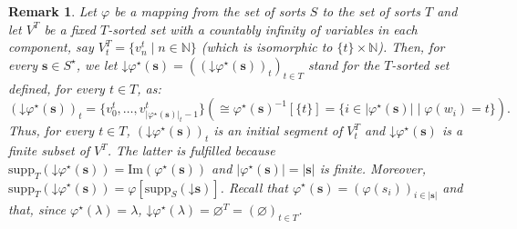 \documentclass{amsart}
\newcommand{\bb}[1]{\ensuremath
	{\lvert #1 \rvert}}
\newcommand{\vs}[1]{\mathbin{\downarrow}#1}
\theoremstyle{plain}
\newtheorem{remark}[theorem]{Remark}
\theoremstyle{definition}
\begin{document}
\begin{remark}\label{Rdop}
	Let $\varphi$ be a mapping from the set of sorts $S$ to the set of sorts $T$ and let $V^{T}$ be a fixed $T$-sorted set with a countably infinity of variables in each component, say $V^{T}_{t} = \{v^{t}_{n}\mid n\in \mathbb{N}\}$ (which is isomorphic to $\{t\}\times\mathbb{N}$). Then, for every $\mathbf{s}\in S^{\star}$, we let $\vs{\varphi^{\star}(\mathbf{s})} = ((\vs{\varphi^{\star}(\mathbf{s})})_{t})_{t\in T}$ stand for the $T$-sorted set  defined, for every $t\in T$, as:
	$$
	(\vs{\varphi^{\star}(\mathbf{s})})_{t} = \{v^{t}_{0},\ldots,v^{t}_{\bb{\varphi^{\star}(\mathbf{s})}_{t}-1}\} (\cong \varphi^{\star}(\mathbf{s})^{-1}[\{t\}] = \{i\in \bb{\varphi^{\star}(\mathbf{s})}\mid \varphi(w_{i}) = t\}).
	$$
	Thus, for every $t\in T$, $(\vs{\varphi^{\star}(\mathbf{s})})_{t}$ is an initial segment of $V^{T}_{t}$ and 
	$\vs{\varphi^{\star}(\mathbf{s})}$ is a finite subset of $V^{T}$. The latter is fulfilled because $\mathrm{supp}_{T}(\vs{\varphi^{\star}(\mathbf{s})}) = \mathrm{Im}(\varphi^{\star}(\mathbf{s}))$ and $\bb{\varphi^{\star}(\mathbf{s})} = \bb{\mathbf{s}}$ is finite. Moreover, $\mathrm{supp}_{T}(\vs{\varphi^{\star}(\mathbf{s})}) =\varphi[\mathrm{supp}_{S}(\vs{\mathbf{s}})]$. Recall  that $\varphi^{\star}(\mathbf{s}) = (\varphi(s_{i}))_{i\in \bb{\mathbf{s}}}$ and that, since $\varphi^{\star}(\lambda) = \lambda$, $\vs{\varphi^{\star}(\lambda)} = \varnothing^{T} = (\varnothing)_{t\in T}$.
	

\end{remark}
\end{document}
